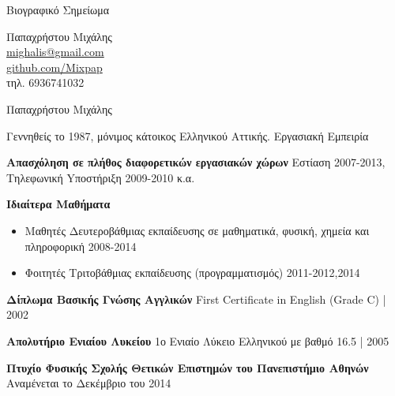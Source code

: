 \documentclass[a4paper,12pt,final]{memoir}
\newcommand{\SmallSep}{\vspace{0.25em}}
\newenvironment{AboutMe}
	{\ignorespaces\textbf{\color{RoyalBlue} \textbullet{}}}
\newcommand{\CVSection}[1]
	{\Large{#1}\par
	\SmallSep\normalsize\normalfont}
\newcommand{\CVItem}[2]
	{\textbf{\color{RoyalBlue} #1} #2}
\newcommand{\location}[1]{ %
\small{\color{headings}#1}}
\newenvironment{tightitemize} %
{\vspace{-\topsep}\begin{itemize}\itemsep1pt \parskip0pt \parsep0pt}
{\end{itemize}\vspace{-\topsep}}
\begin{document}
\begin{flushright}
Βιογραφικό Σημείωμα
\vspace{0.75cm}

\small
	Παπαχρήστου Μιχάλης \\
	\url{mighalis@gmail.com}  \\
	\url{github.com/Mixpap} \\
	τηλ. 6936741032
\end{flushright}\normalsize
\framebreak


\Huge {\color{RoyalBlue} Παπαχρήστου Μιχάλης} \\

\normalsize\normalfont

\begin{AboutMe}
Γεννηθείς το 1987, μόνιμος κάτοικος Ελληνικού Αττικής.
\end{AboutMe}

\CVSection{Εργασιακή Εμπειρία}

\SmallSep

\CVItem{Aπασχόληση σε πλήθος διαφορετικών εργασιακών χώρων}{\newline}
\location{Eστίαση 2007-2013, Tηλεφωνική Yποστήριξη 2009-2010 κ.α.}


\CVItem{Ιδιαίτερα Μαθήματα}{}
\begin{tightitemize}
	\item Μαθητές Δευτεροβάθμιας εκπαίδευσης σε μαθηματικά, φυσική, χημεία και πληροφορική \location{2008-2014}
	\item Φοιτητές Τριτοβάθμιας εκπαίδευσης (προγραμματισμός)
	\location{2011-2012,2014}
\end{tightitemize}
\SmallSep

\CVItem{Δίπλωμα Βασικής Γνώσης Αγγλικών}{\newline}
\location{First Certificate in English (Grade C) | 2002}
\SmallSep

\CVItem{Απολυτήριο Ενιαίου Λυκείου}{\newline}
\location{1ο Ενιαίο Λύκειο Ελληνικού με βαθμό 16.5 | 2005}
\SmallSep

\CVItem{Πτυχίο Φυσικής Σχολής Θετικών Επιστημών του Πανεπιστήμιο Αθηνών}{\newline}
\location{Αναμένεται το Δεκέμβριο του 2014}
\SmallSep
\end{document}
